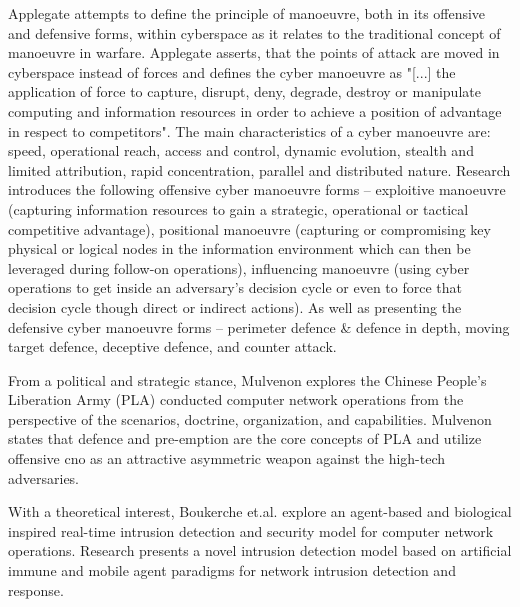 Applegate \cite{Applegate2012} attempts to define the principle of manoeuvre, both in its offensive and defensive forms, within cyberspace as it relates to the traditional concept of manoeuvre in warfare. Applegate asserts, that the points of attack are moved in cyberspace instead of forces and defines the cyber manoeuvre as "[...] the application of force to capture, disrupt, deny, degrade, destroy or manipulate computing and information resources in order to achieve a position of advantage in respect to competitors". The main characteristics of a cyber manoeuvre are: speed, operational reach, access and control, dynamic evolution, stealth and limited attribution, rapid concentration, parallel and distributed nature.
Research introduces the following offensive cyber manoeuvre forms -- exploitive manoeuvre (capturing information resources to gain a strategic, operational or tactical competitive advantage), positional manoeuvre (capturing or compromising key physical or logical nodes in the information environment which can then be leveraged during follow-on operations), influencing manoeuvre (using cyber operations to get inside an adversary's decision cycle or even to force that decision cycle though direct or indirect actions). As well as presenting the defensive cyber manoeuvre forms -- perimeter defence \& defence in depth, moving target defence, deceptive defence, and counter attack. 

From a political and strategic stance, Mulvenon \cite{Mulvenon2009} explores the Chinese People's Liberation Army (PLA) conducted computer network operations from the perspective of the scenarios, doctrine, organization, and capabilities. Mulvenon states that defence and pre-emption are the core concepts of PLA and utilize offensive \gls{cno} as an attractive asymmetric weapon against the high-tech adversaries.

With a theoretical interest, Boukerche et.al. \cite{Boukerche2007} explore an agent-based and biological inspired real-time intrusion detection and security model for computer network operations. Research presents a novel intrusion detection model based on artificial immune and mobile agent paradigms for network intrusion detection and response.